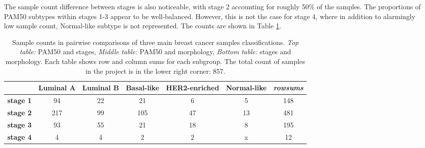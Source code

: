     The sample count difference between stages is also noticeable, with stage 2 accounting for roughly 50\% of the samples. The proportions of PAM50 subtypes within stages 1-3 appear to be well-balanced. However, this is not the case for stage 4, where in addition to alarmingly low sample count, Normal-like subtype is not represented. The counts are shown in Table \ref{table:counts}.  
        
        
                \begin{table}[!h]
                \centering
               \scriptsize
                \caption[Sample counts per each pairwise subgroup in the dataset]{Sample counts in pairwise comparisons of three main breast cancer samples classifications. \textit{Top table:} PAM50 and stages,\textit{ Middle table:} PAM50 and morphology, \textit{Bottom table:} stages and morphology. Each table shows row and column sums for each subgroup. The total count of samples in the project is in the lower right corner: 857.}
                \label{table:counts}      
                \begin{tabular}{ccccccc}
                \multicolumn{1}{l|}{} & \multicolumn{1}{c|}{\textbf{Luminal A}} & \multicolumn{1}{c|}{\textbf{Luminal B}} & \multicolumn{1}{c|}{\textbf{Basal-like}} & \multicolumn{1}{c|}{\textbf{HER2-enriched}} & \multicolumn{1}{c|}{\textbf{Normal-like}} & {\color[HTML]{9B9B9B} \textit{rowsums}} \\ \hline
                \multicolumn{1}{c|}{\textbf{stage 1}} & \multicolumn{1}{c|}{94} & \multicolumn{1}{c|}{22} & \multicolumn{1}{c|}{21} & \multicolumn{1}{c|}{6} & \multicolumn{1}{c|}{5} & \multicolumn{1}{c|}{{\color[HTML]{656565} 148}} \\ \hline
                \multicolumn{1}{c|}{\textbf{stage 2}} & \multicolumn{1}{c|}{217} & \multicolumn{1}{c|}{99} & \multicolumn{1}{c|}{105} & \multicolumn{1}{c|}{47} & \multicolumn{1}{c|}{13} & \multicolumn{1}{c|}{{\color[HTML]{656565} 481}} \\ \hline
                \multicolumn{1}{c|}{\textbf{stage 3}} & \multicolumn{1}{c|}{93} & \multicolumn{1}{c|}{55} & \multicolumn{1}{c|}{21} & \multicolumn{1}{c|}{18} & \multicolumn{1}{c|}{8} & \multicolumn{1}{c|}{{\color[HTML]{656565} 195}} \\ \hline
                \multicolumn{1}{c|}{\textbf{stage 4}} & \multicolumn{1}{c|}{4} & \multicolumn{1}{c|}{4} & \multicolumn{1}{c|}{2} & \multicolumn{1}{c|}{2} & \multicolumn{1}{c|}{{\color[HTML]{656565} x}} & \multicolumn{1}{c|}{{\color[HTML]{656565} 12}} \\ \hline

\end{tabular}
\end{table}
